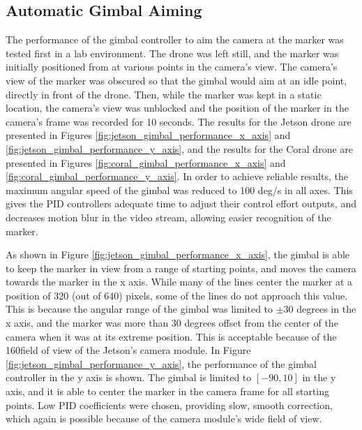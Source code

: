 \subsection{Automatic Gimbal Aiming}

The performance of the gimbal controller to aim the camera at the marker was tested first in a lab environment. The drone was left still, and the marker was initially positioned from at various points in the camera's view. The camera's view of the marker was obscured so that the gimbal would aim at an idle point, directly in front of the drone. Then, while the marker was kept in a static location, the camera's view was unblocked and the position of the marker in the camera's frame was recorded for 10 seconds. The results for the Jetson drone are presented in Figures \ref{fig:jetson_gimbal_performance_x_axis} and \ref{fig:jetson_gimbal_performance_y_axis}, and the results for the Coral drone are presented in Figures \ref{fig:coral_gimbal_performance_x_axis} and \ref{fig:coral_gimbal_performance_y_axis}. In order to achieve reliable results, the maximum angular speed of the gimbal was reduced to 100 deg/s in all axes. This gives the PID controllers adequate time to adjust their control effort outputs, and decreases motion blur in the video stream, allowing easier recognition of the marker.

As shown in Figure \ref{fig:jetson_gimbal_performance_x_axis}, the gimbal is able to keep the marker in view from a range of starting points, and moves the camera towards the marker in the x axis. While many of the lines center the marker at a position of 320 (out of 640) pixels, some of the lines do not approach this value. This is because the angular range of the gimbal was limited to $\pm$30 degrees in the x axis, and the marker was more than 30 degrees offset from the center of the camera when it was at its extreme position. This is acceptable because of the 160\degree field of view of the Jetson's camera module. In Figure \ref{fig:jetson_gimbal_performance_y_axis}, the performance of the gimbal controller in the y axis is shown. The gimbal is limited to $[-90, 10]$ in the y axis, and it is able to center the marker in the camera frame for all starting points. Low PID coefficients were chosen, providing slow, smooth correction, which again is possible because of the camera module's wide field of view.

